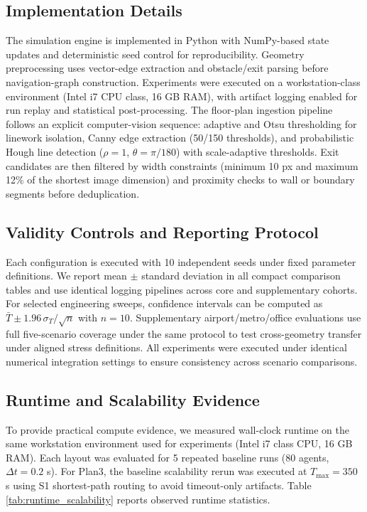 \documentclass[utf8]{FrontiersinHarvard}
\begin{document}
\subsection{Implementation Details}
The simulation engine is implemented in Python with NumPy-based state updates and deterministic seed control for reproducibility. Geometry preprocessing uses vector-edge extraction and obstacle/exit parsing before navigation-graph construction. Experiments were executed on a workstation-class environment (Intel i7 CPU class, 16 GB RAM), with artifact logging enabled for run replay and statistical post-processing.
The floor-plan ingestion pipeline follows an explicit computer-vision sequence: adaptive and Otsu thresholding for linework isolation, Canny edge extraction (50/150 thresholds), and probabilistic Hough line detection ($\rho=1$, $\theta=\pi/180$) with scale-adaptive thresholds. Exit candidates are then filtered by width constraints (minimum 10 px and maximum 12\% of the shortest image dimension) and proximity checks to wall or boundary segments before deduplication.

\subsection{Validity Controls and Reporting Protocol}
Each configuration is executed with 10 independent seeds under fixed parameter definitions. We report mean $\pm$ standard deviation in all compact comparison tables and use identical logging pipelines across core and supplementary cohorts. For selected engineering sweeps, confidence intervals can be computed as $\bar{T} \pm 1.96\,\sigma_T/\sqrt{n}$ with $n=10$. Supplementary airport/metro/office evaluations use full five-scenario coverage under the same protocol to test cross-geometry transfer under aligned stress definitions.
All experiments were executed under identical numerical integration settings to ensure consistency across scenario comparisons.

\subsection{Runtime and Scalability Evidence}
To provide practical compute evidence, we measured wall-clock runtime on the same workstation environment used for experiments (Intel i7 class CPU, 16 GB RAM). Each layout was evaluated for 5 repeated baseline runs (80 agents, $\Delta t=0.2$ s). For Plan3, the baseline scalability rerun was executed at $T_{\max}=350$ s using S1 shortest-path routing to avoid timeout-only artifacts. Table \ref{tab:runtime_scalability} reports observed runtime statistics.
\end{document}
